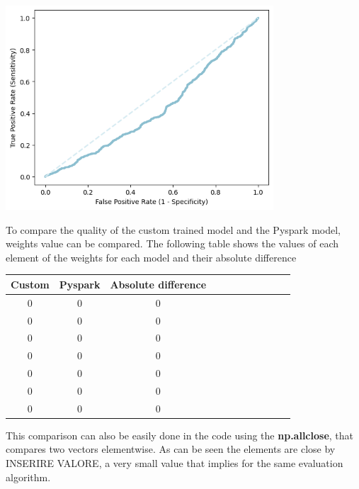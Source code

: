\documentclass[
	letterpaper, %
	10pt, %
]{class}
\begin{document}
\begin{center}
    \includegraphics[width=10cm]{../images/ml_logistic.png}
\end{center}

To compare the quality of the custom trained model and the Pyspark model, weights value can be compared. The following table shows the values of each element of the weights for each model and their absolute difference

\begin{center}
    \begin{tabular}{ |c|c|c|c|c|c|c|c|c|c|c| }
        \hline
        Custom & Pyspark & Absolute difference \\
        \hline
        0      & 0       & 0                   \\
        0      & 0       & 0                   \\
        0      & 0       & 0                   \\
        0      & 0       & 0                   \\
        0      & 0       & 0                   \\
        0      & 0       & 0                   \\
        0      & 0       & 0                   \\
        \hline
    \end{tabular}
\end{center}

This comparison can also be easily done in the code using the \textbf{np.allclose}, that compares two vectors elementwise.
As can be seen the elements are close by INSERIRE VALORE, a very small value that implies for the same evaluation algorithm.\\
\end{document}
